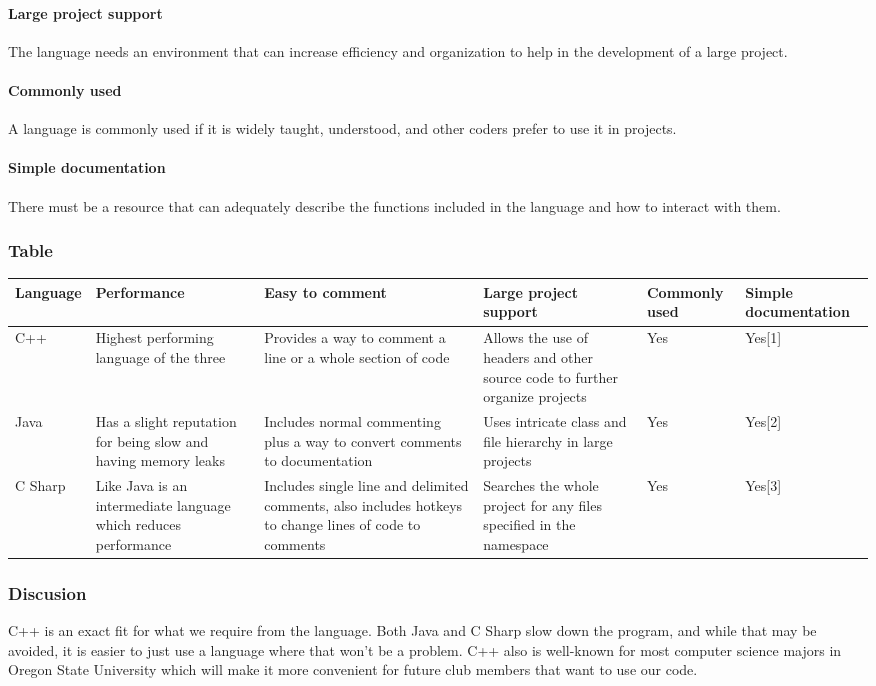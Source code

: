 \documentclass[10pt,letterpaper,onecolumn,draftclsnofoot]{IEEEtran}
\begin{document}
\paragraph{Large project support}
The language needs an environment that can increase efficiency and organization to help in the development of a large project.

\paragraph{Commonly used}
A language is commonly used if it is widely taught, understood, and other coders prefer to use it in projects.

\paragraph{Simple documentation}
There must be a resource that can adequately describe the functions included in the language and how to interact with them.

\subsubsection{Table}
\begin{center}
\begin{tabular}{ ||B|M|M|M|M|M|| } 
\hline
Language & Performance & Easy to comment & Large project support & Commonly used & Simple documentation\\
 \hline
 C++ & Highest performing language of the three & Provides a way to comment a line or a whole section of code & Allows the use of headers and other source code to further organize projects & Yes & Yes[1]\\ 
 \hline
 Java & Has a slight reputation for being slow and having memory leaks & Includes normal commenting plus a way to convert comments to documentation & Uses intricate class and file hierarchy in large projects & Yes & Yes[2]\\ 
 \hline
 C Sharp & Like Java is an intermediate language which reduces performance & Includes single line and delimited comments, also includes hotkeys to change lines of code to comments & Searches the whole project for any files specified in the namespace & Yes & Yes[3]\\ 
 \hline
\end{tabular}
\end{center}

\subsubsection{Discusion}
C++ is an exact fit for what we require from the language. Both Java and C Sharp slow down the program, and while that may be avoided, it is easier to just use a language where that won't be a problem. C++ also is well-known for most computer science majors in Oregon State University which will make it more convenient for future club members that want to use our code.
\end{document}
